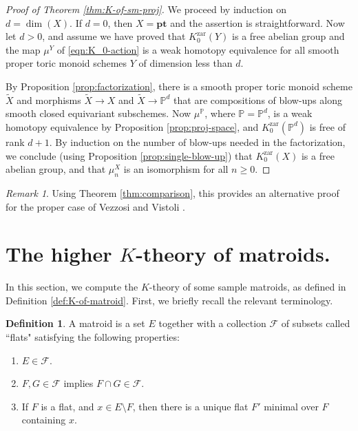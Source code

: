 \documentclass[12pt]{amsart}
\def\cF{\mathcal F}
\def\Kzar{K^{\mathrm{zar}}}
\newcommand{\bbP}{\mathbb{P}}
\newcommand{\pt}{\mathbf{pt}}
\numberwithin{equation}{section}
\theoremstyle{plain}
\theoremstyle{definition}
\newtheorem{defn}[equation]{Definition}
\theoremstyle{remark}
\newtheorem{rem}[equation]{Remark}
\begin{document}
\begin{proof}[Proof of Theorem \ref{thm:K-of-sm-proj}]
We proceed by induction on $d = \dim (X)$. If $d = 0$,
then $X = \pt$ and the assertion is straightforward.
Now let $d > 0$, and assume we have proved that $\Kzar_0(Y)$ is a
free abelian group and the map $\mu^Y$ of \eqref{eqn:K_0-action}
  is a weak homotopy equivalence for all smooth proper toric
  monoid schemes $Y$ of dimension less than $d$. 
		
  By Proposition \ref{prop:factorization}, there is a smooth proper
  toric monoid scheme $\tilde{X}$ and morphisms $\tilde{X}\to X$
  and $\tilde{X}\to\bbP^d$ that are compositions of blow-ups
  along smooth closed equivariant subschemes. Now $\mu^{\bbP}$,
  where $\bbP = \bbP^d$, is a weak homotopy equivalence by
  Proposition \ref{prop:proj-space}, and $\Kzar_0(\bbP^d)$ is
  free of rank $d+1$. 
  By induction on the number of blow-ups needed in the factorization,
  we conclude (using  Proposition \ref{prop:single-blow-up}) that
  $\Kzar_0(X)$ is a free abelian group, and that $\mu^X_n$ is an
  isomorphism for all $n\geq 0$. 
\end{proof}
	
\begin{rem}
  Using Theorem \ref{thm:comparison}, this provides
  an alternative proof for the proper case of
  Vezzosi and Vistoli \cite[Cor.\,6.10]{VV}.
\end{rem}

\section{The higher $K$-theory of matroids.}\label{sec:samples}

In this section, we compute the $K$-theory of some sample matroids,
as defined in Definition \ref{def:K-of-matroid}.
First, we briefly recall the relevant terminology.

\begin{defn}\label{lin-flat-defn}
A matroid is a set $E$ together with a collection 
$\cF$ of subsets called ``flats" satisfying the following properties:
\begin{enumerate}
\item[(i)] $E\in\cF$.  
\item[(ii)] $F,G\in\cF$ implies $F\cap G\in\cF$.
\item[(iii)] If $F$ is a flat, and $x\in E\setminus F$, 
  then there is a unique flat $F'$ minimal over $F$ containing $x$. 
	\end{enumerate}	
\end{defn}
\end{document}
